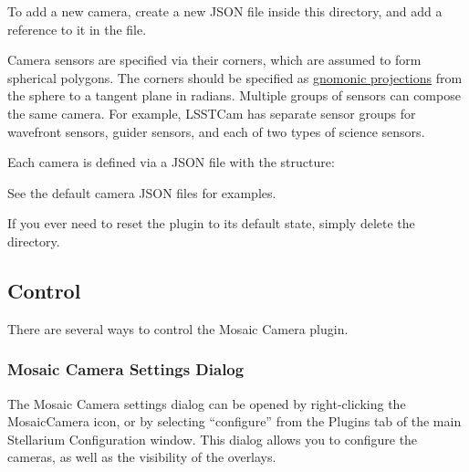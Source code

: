 To add a new camera, create a new JSON file inside this directory, and add a reference to it in the  file.

Camera sensors are specified via their corners, which are assumed to form spherical polygons.
The corners should be specified as \href{https://en.wikipedia.org/wiki/Gnomonic_projection}{gnomonic projections} from the sphere to a tangent plane in radians.
Multiple groups of sensors can compose the same camera.
For example, LSSTCam has separate sensor groups for wavefront sensors, guider sensors, and each of two types of science sensors.

\newpage

Each camera is defined via a JSON file with the structure:

\begin{jsonfile}
\end{jsonfile}

See the default camera JSON files for examples.

If you ever need to reset the plugin to its default state, simply delete the  directory.

\subsection{Control}
\label{sec:plugins:MosaicCamera:control}

There are several ways to control the Mosaic Camera plugin.

\subsubsection{Mosaic Camera Settings Dialog}
\label{sec:plugins:MosaicCamera:control:dialog}

The Mosaic Camera settings dialog can be opened by right-clicking the MosaicCamera icon, or by selecting ``configure'' from the Plugins tab of the main Stellarium Configuration window.
This dialog allows you to configure the cameras, as well as the visibility of the overlays.

